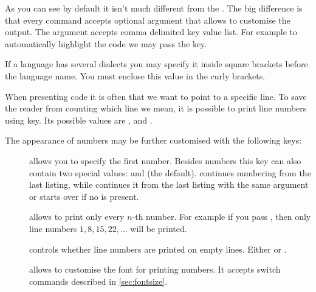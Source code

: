 As you can see by default it isn't much different from the . The big difference is that every command accepts optional
argument that allows to customise the output. The argument accepts comma
delimited key value list. For example to automatically highlight the code we
may pass the  key.
\begin{example}[examplewidth=0.6\linewidth, vertical_mode]

\end{example}
If a language has several dialects you may specify it inside square brackets
before the language name. You must enclose this value in the curly brackets.
\begin{example}[examplewidth=0.8\linewidth, vertical_mode]
TeX}]{hello.tex}
\end{example}
When presenting code it is often that we want to point to a specific line. To
save the reader from counting which line we mean, it is possible to print line
numbers using  key. Its possible values are ,
 and .
\begin{example}[examplewidth=0.8\linewidth, vertical_mode]
\lstset{xleftmargin=1.2em}%

\end{example}
The appearance of numbers may be further customised with the following keys:
\begin{description}
  \item[] allows you to specify the first number. Besides
    numbers this key can also contain two special values:  and
     (the default).  continues numbering from the last
    listing, while  continues it from the last listing with the
    same  argument or starts over if no  is present.
  \item[] allows to print only every \(n\)-th number. For
    example if you pass , then only line numbers \(1, 8,
    15, 22, \ldots\) will be printed.
  \item[] controls whether line numbers are printed on
    empty lines. Either  or .
  \item[] allows to customise the font for printing
    numbers. It accepts switch commands described in \autoref{sec:fontsize}.
\end{description}
\begin{example}[examplewidth=0.61\linewidth]

\end{example}

